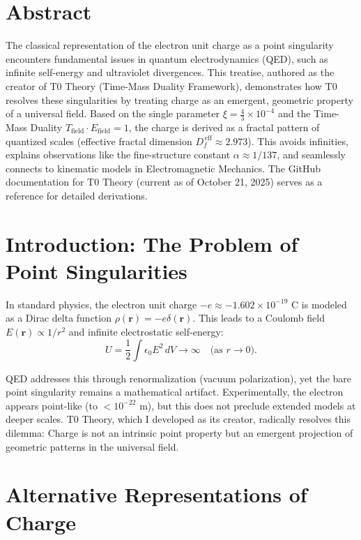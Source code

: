 \section*{Abstract}
		The classical representation of the electron unit charge as a point singularity encounters fundamental issues in quantum electrodynamics (QED), such as infinite self-energy and ultraviolet divergences. This treatise, authored as the creator of T0 Theory (Time-Mass Duality Framework), demonstrates how T0 resolves these singularities by treating charge as an emergent, geometric property of a universal field. Based on the single parameter $\xi = \frac{4}{3} \times 10^{-4}$ and the Time-Mass Duality $T_{\text{field}} \cdot E_{\text{field}} = 1$, the charge is derived as a fractal pattern of quantized scales (effective fractal dimension $D_f^{\,\text{eff}} \approx 2.973$). This avoids infinities, explains observations like the fine-structure constant $\alpha \approx 1/137$, and seamlessly connects to kinematic models in Electromagnetic Mechanics. The GitHub documentation for T0 Theory (current as of October 21, 2025) serves as a reference for detailed derivations.

	
	
	\section{Introduction: The Problem of Point Singularities}
	\label{sec:intro}
	
	In standard physics, the electron unit charge $-e \approx -1.602 \times 10^{-19}$ C is modeled as a Dirac delta function $\rho(\mathbf{r}) = -e \delta(\mathbf{r})$. This leads to a Coulomb field $E(\mathbf{r}) \propto 1/r^2$ and infinite electrostatic self-energy:
	\begin{equation}
		U = \frac{1}{2} \int \epsilon_0 E^2 \, dV \to \infty \quad \text{(as $r \to 0$)}.
	\end{equation}
	
	QED addresses this through renormalization (vacuum polarization), yet the bare point singularity remains a mathematical artifact. Experimentally, the electron appears point-like (to $< 10^{-22}$ m), but this does not preclude extended models at deeper scales. T0 Theory, which I developed as its creator, radically resolves this dilemma: Charge is not an intrinsic point property but an emergent projection of geometric patterns in the universal field.
	
	\section{Alternative Representations of Charge}
	\label{sec:alternatives}
	
